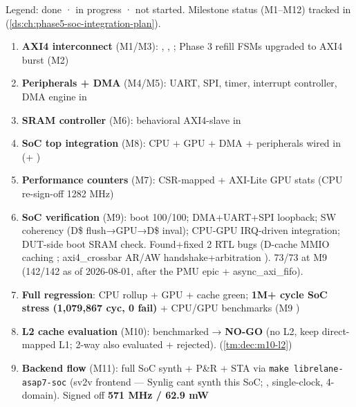 \begin{record}

Legend: \ok{} done · \wip{} in progress · \hold{} not started. Milestone
status (M1--M12) tracked in  (\cref{ds:ch:phase5-soc-integration-plan}).

\begin{enumerate}
\def\labelenumi{\arabic{enumi}.}
\item
  \ok{} \textbf{AXI4 interconnect} (M1/M3): ,
  , ;
  Phase 3 refill FSMs upgraded to AXI4 burst (M2)
\item
  \ok{} \textbf{Peripherals + DMA} (M4/M5): UART, SPI, timer, interrupt
  controller, DMA engine in 
\item
  \ok{} \textbf{SRAM controller} (M6): behavioral AXI4-slave in
\item
  \ok{} \textbf{SoC top integration} (M8): CPU + GPU + DMA + peripherals
  wired in  (+ )
\item
  \ok{} \textbf{Performance counters} (M7): CSR-mapped + AXI-Lite GPU
  stats (CPU re-sign-off 1282 MHz)
\item
  \ok{} \textbf{SoC verification} (M9): boot 100/100; DMA+UART+SPI
  loopback; SW coherency (D\$ flush→GPU→D\$ inval); CPU-GPU IRQ-driven
  integration; DUT-side boot SRAM check. Found+fixed 2 RTL bugs (D-cache
  MMIO caching ; axi4\_\allowbreak{}crossbar AR/AW
  handshake+arbitration ).  73/73 at M9 (142/142
  as of 2026-08-01, after the PMU epic + 
  async\_\allowbreak{}axi\_\allowbreak{}fifo).
\item
  \ok{} \textbf{Full regression}: CPU rollup + GPU + cache green;
  \textbf{1M+ cycle SoC stress (1,079,867 cyc, 0 fail)} + CPU/GPU
  benchmarks (M9 )
\item
  \ok{} \textbf{L2 cache evaluation} (M10): benchmarked → \textbf{NO-GO}
  (no L2, keep direct-mapped L1; 2-way also evaluated + rejected).
   (\cref{tm:dec:m10-l2})
\item
  \ok{} \textbf{Backend flow} (M11): full SoC synth + P\&R + STA via
  \texttt{make\ librelane-\allowbreak{}asap7-\allowbreak{}soc} (sv2v
  frontend --- Synlig can\textquotesingle t synth this SoC;
  ,  single-clock,
   4-domain). Signed off \textbf{571 MHz / 62.9 mW
}
\end{enumerate}
\end{record}
